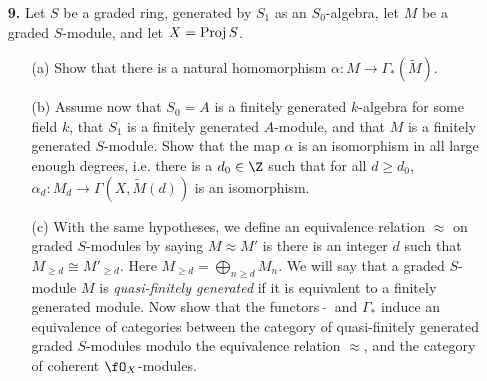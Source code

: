 \documentclass[a4paper]{article}
\begin{document}
\begin{enumerate} [label=\textbf{\arabic*.}, leftmargin=0em]
\begin{proof}
\begin{itemize} [leftmargin=0cm]
        \item[(c)] Let $x \in X$, let $\spec{A}$ be an open affine neighborhood of $x$ for some noetherian reduced ring $A$, and let $\goth{p}$ be the prime ideal corresponding to $x \in \spec{A}$. Set $r = \varphi(x)$. By (5.4), there exists a finitely generated $A$-module $M$ such that $\restr{\fF}{\spec{A}} = \tilde{M}$. Let $m_1, \dots, m_r \in \fF_x \cong M_\goth{p}$ such that their image in $\fF_x \otimes_{\fO_x} k(x)$ form a $k(x)$-basis. By Nakayama's lemma, the $m_i$'s generate $M_\goth{p}$ over $A_\goth{p}$, so they generate $M_\goth{q}$ for all prime ideals $\goth{q} \subseteq \goth{p}$. Suppose $\sum_{i = 1}^r a_i m_i = 0$ for $a_i \in A_\goth{p}$. Since the image of the $m_i$ in $M_\goth{q} \otimes_{A_\goth{q}} k(\goth{q})$ for all $i = 1, \dots, r$ form a $k(\goth{q})$-basis, the images of $a_i$ in $k(\goth{q})$ must be zero for all $i$. This implies $a_i$ is contained in all prime ideals of $A_\goth{p}$. However, $A_\goth{p}$ is reduced, so $a_i = 0$. Hence, $m_i$ are linearly independent.
    \end{itemize}
\end{proof}

\item[\textbf{9.}] Let $S$ be a graded ring, generated by $S_1$ as an $S_0$-algebra, let $M$ be a graded $S$-module, and let $X = \operatorname{Proj}{S}$.
\begin{itemize}
    \item[(a)] Show that there is a natural homomorphism $\alpha : M \to \Gamma_*(\tilde{M})$.
    \item[(b)] Assume now that $S_0 = A$ is a finitely generated $k$-algebra for some field $k$, that $S_1$ is a finitely generated $A$-module, and that $M$ is a finitely generated $S$-module. Show that the map $\alpha$ is an isomorphism in all large enough degrees, i.e. there is a $d_0 \in \Z$ such that for all $d \geq d_0$, $\alpha_d : M_d \to \Gamma(X, \tilde{M}(d))$ is an isomorphism.
    \item[(c)] With the same hypotheses, we define an equivalence relation $\approx$ on graded $S$-modules by saying $M \approx M'$ is there is an integer $d$ such that $M_{\geq d} \cong M'_{\geq d}$. Here $M_{\geq d} = \bigoplus_{n \geq d} M_n$. We will say that a graded $S$-module $M$ is \textit{quasi-finitely generated} if it is equivalent to a finitely generated module. Now show that the functors $~\tilde{}~$ and $\Gamma_*$ induce an equivalence of categories between the category of quasi-finitely generated graded $S$-modules modulo the equivalence relation $\approx$, and the category of coherent $\fO_X$-modules.
\end{itemize}


\end{enumerate}
\end{document}
